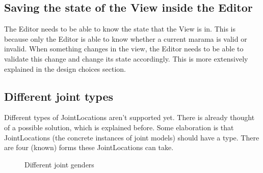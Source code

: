 \documentclass[10pt]{extarticle} %
\begin{document}
    \subsection{Saving the state of the View inside the Editor}
    The Editor needs to be able to know the state that the View is in.
    This is because only the Editor is able to know whether a current marama is valid or invalid.
    When something changes in the view, the Editor needs to be able to validate this change and change its state accordingly.
    This is more extensively explained in the design choices\cite{sec:marama-storage} section.

    \subsection{Different joint types}
    Different types of JointLocations aren't supported yet.
    There is already thought of a possible solution, which is explained before\cite{sec:marama-storage}.
    Some elaboration is that JointLocations (the concrete instances of joint models) should have a type.
    There are four (known) forms these JointLocations can take.


    \begin{figure}[htb]
        \centering
        \qquad
        \caption{Different joint genders}
        \label{fig:JointGenders}
    \end{figure}
\end{document}
